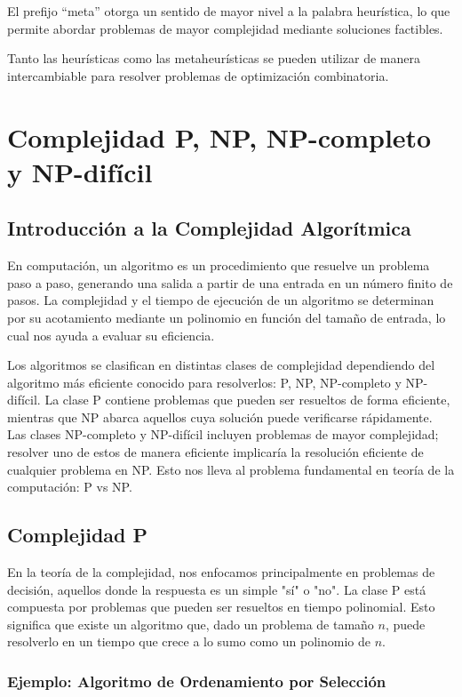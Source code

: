 \documentclass[12pt,titlepage,twoside,openright]{book}
\begin{document}
El prefijo ``meta'' otorga un sentido de mayor nivel a la palabra heur\'istica, lo que permite abordar problemas de mayor complejidad mediante soluciones factibles.

Tanto las heur\'isticas como las metaheur\'isticas se pueden utilizar de manera intercambiable para resolver problemas de optimizaci\'on combinatoria.

\section{Complejidad P, NP, NP-completo y NP-difícil}

\subsection{Introducción a la Complejidad Algorítmica}

En computación, un algoritmo es un procedimiento que resuelve un problema paso a paso, generando una salida a partir de una entrada en un número finito de pasos. La complejidad y el tiempo de ejecución de un algoritmo se determinan por su acotamiento mediante un polinomio en función del tamaño de entrada, lo cual nos ayuda a evaluar su eficiencia.

Los algoritmos se clasifican en distintas clases de complejidad dependiendo del algoritmo más eficiente conocido para resolverlos: P, NP, NP-completo y NP-difícil. La clase P contiene problemas que pueden ser resueltos de forma eficiente, mientras que NP abarca aquellos cuya solución puede verificarse rápidamente. Las clases NP-completo y NP-difícil incluyen problemas de mayor complejidad; resolver uno de estos de manera eficiente implicaría la resolución eficiente de cualquier problema en NP. Esto nos lleva al problema fundamental en teoría de la computación: P vs NP.

\subsection{Complejidad P}

En la teoría de la complejidad, nos enfocamos principalmente en problemas de decisión, aquellos donde la respuesta es un simple "sí" o "no". La clase P está compuesta por problemas que pueden ser resueltos en tiempo polinomial. Esto significa que existe un algoritmo que, dado un problema de tamaño $n$, puede resolverlo en un tiempo que crece a lo sumo como un polinomio de $n$.

\subsubsection{Ejemplo: Algoritmo de Ordenamiento por Selección}
\end{document}

